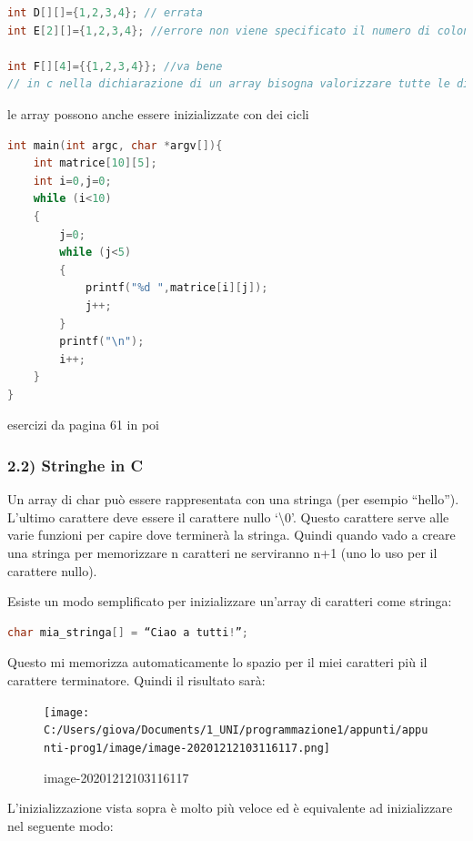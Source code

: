 \documentclass[
  paper=a4,
  oneside  ,captions=tableheading
]{scrbook}
\begin{document}
\begin{lstlisting}[language={C++}]
int D[][]={1,2,3,4}; // errata
int E[2][]={1,2,3,4}; //errore non viene specificato il numero di colonne

int F[][4]={{1,2,3,4}}; //va bene 
// in c nella dichiarazione di un array bisogna valorizzare tutte le dimensioni, si può fare a meno di quella più a sinistra 
\end{lstlisting}

le array possono anche essere inizializzate con dei cicli

\begin{lstlisting}[language={C++}]
int main(int argc, char *argv[]){
    int matrice[10][5];
    int i=0,j=0;
    while (i<10)
    {
        j=0;
        while (j<5)
        {
            printf("%d ",matrice[i][j]);
            j++;
        }
        printf("\n");
        i++;
    }
}
\end{lstlisting}

esercizi da pagina 61 in poi

\hypertarget{stringhe-in-c}{%
\subsubsection{2.2) Stringhe in C}\label{stringhe-in-c}}

Un array di char può essere rappresentata con una stringa (per esempio
``hello''). L'ultimo carattere deve essere il carattere nullo
`\textbackslash0'. Questo carattere serve alle varie funzioni per capire
dove terminerà la stringa. Quindi quando vado a creare una stringa per
memorizzare n caratteri ne serviranno n+1 (uno lo uso per il carattere
nullo).

Esiste un modo semplificato per inizializzare un'array di caratteri come
stringa:

\begin{lstlisting}[language={C++}]
char mia_stringa[] = “Ciao a tutti!”;
\end{lstlisting}

Questo mi memorizza automaticamente lo spazio per il miei caratteri più
il carattere terminatore. Quindi il risultato sarà:

\begin{figure}
\centering
\texttt{[image: C:/Users/giova/Documents/1\_UNI/programmazione1/appunti/appunti-prog1/image/image-20201212103116117.png]}
\caption{image-20201212103116117}
\end{figure}

L'inizializzazione vista sopra è molto più veloce ed è equivalente ad
inizializzare nel seguente modo:
\end{document}
